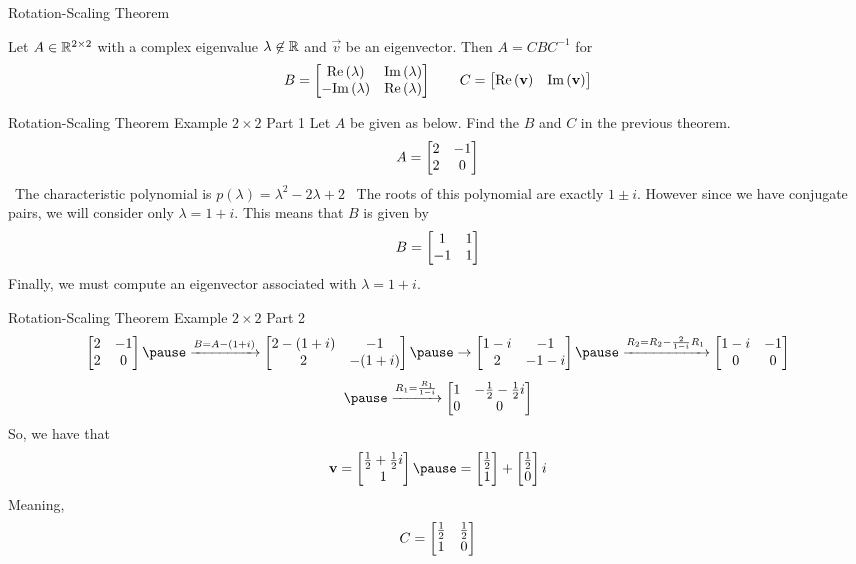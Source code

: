 \documentclass[xcoler=dvipsnames, aspectratio=169]{beamer}
\renewcommand{\Re}[1]{\textrm{Re}\left(#1\right)}
\renewcommand{\Im}[1]{\textrm{Im}\left(#1\right)}
\begin{document}
    \begin{frame}{Rotation-Scaling Theorem}
        \begin{theorem}
            Let $A\in\mathbb{R}^{2\times 2}$ with a complex eigenvalue $\lambda\not\in\mathbb{R}$ and $\vec{v}$ be
            an eigenvector. Then $A=CBC^{-1}$ for
            \[
                B = \bMat{
                    \Re{\lambda} & \Im{\lambda}\\
                    -\Im{\lambda}& \Re{\lambda}
                } \qquad C = \bMat{
                    \Re{\vec{v}} & \Im{\vec{v}}
                }
            \]
        \end{theorem}
    \end{frame}
    \begin{frame}{Rotation-Scaling Theorem Example $2\times 2$ Part 1}
    Let $A$ be given as below. Find the $B$ and $C$ in the previous theorem.
    \[
        A = \begin{bmatrix}
            2 & -1\\
            2 &  0
        \end{bmatrix}
    \]\pause\ The characteristic polynomial is $p(\lambda) = \lambda^2 - 2\lambda + 2$
    \pause\
    The roots of this polynomial are exactly $1\pm i$. However since we have conjugate pairs, we
        will consider only $\lambda=1+i$. This means that $B$ is given by
        \[
            B = \begin{bmatrix}
                1 & 1\\
                -1& 1
            \end{bmatrix}
        \]\pause
        Finally, we must compute an eigenvector associated with $\lambda=1+i$.
    \end{frame}
    \begin{frame}{Rotation-Scaling Theorem Example $2\times 2$ Part 2}
        \[
            \bMat{2 & -1\\2 & 0}\pause\xrightarrow{B=A-(1+i)}\bMat{
                2-(1+i) & -1\\
                2 & -(1+i)
            }\pause\rightarrow\bMat{
                1-i & -1\\
                2 & -1-i
            }\pause\xrightarrow{R_2=R_2 - \frac{2}{1-i}R_1}\bMat{1-i & -1\\0 & 0}
        \]
        \[
            \pause\xrightarrow{R_1 = \frac{R_1}{1-i}}\bMat{
                1 & -\frac{1}{2} - \frac{1}{2}i\\
                0 & 0
            }
        \]\pause
        So, we have that 
        \[
            \vec{v} = \bMat{
                \frac{1}{2} + \frac{1}{2}i\\
                1
            }\pause = \bMat{
                \frac{1}{2}\\
                1
            } + \bMat{
                \frac{1}{2}\\
                0
            }i
        \]\pause
        Meaning, 
        \[
            C = \begin{bmatrix}
                \frac{1}{2} & \frac{1}{2}\\
                1 & 0
            \end{bmatrix}
        \]
    \end{frame}
\end{document}
